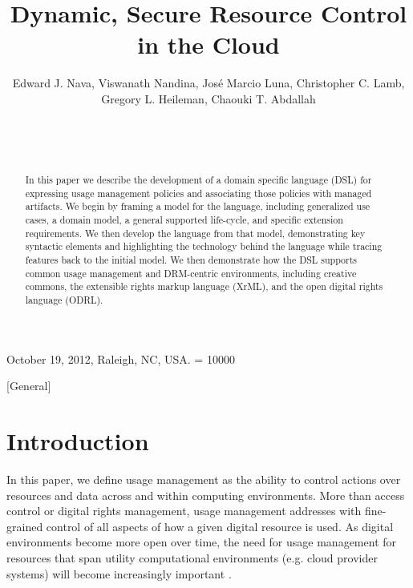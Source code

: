 \documentclass{acm_proc_article-sp}
\begin{document}
\title{Dynamic, Secure Resource Control in the Cloud}


\author{
\alignauthor
Edward J. Nava, Viswanath Nandina, Jos\'e Marcio Luna, Christopher C. Lamb, Gregory L. Heileman, Chaouki T. Abdallah\\
       \\
       \\
       \\
}

 {October 19, 2012, Raleigh, NC, USA.} 
\widowpenalty = 10000

\maketitle

\begin{abstract}
In this paper we describe the development of a domain specific language (DSL) for expressing usage management policies and associating those policies with managed artifacts.  We begin by framing a model for the language, including generalized use cases, a domain model, a general supported life-cycle, and specific extension requirements.  We then develop the language from that model, demonstrating key syntactic elements and highlighting the technology behind the language while tracing features back to the initial model.  We then demonstrate how the DSL supports common usage management and DRM-centric environments, including creative commons, the extensible rights markup language (XrML), and the open digital rights language (ODRL).
\end{abstract}

[General]

\section{Introduction}
In this paper, we define usage management as the ability to control actions over resources and data across and within computing environments.  More than access control or digital rights management, usage management addresses with fine-grained control of all aspects of how a given digital resource is used.  As digital environments become more open over time, the need for usage management for resources that span utility computational environments (e.g. cloud provider systems) will become increasingly important \cite{ctrl:lamb-MCCCS,ctrl:lamb-SOSE}.
\end{document}
